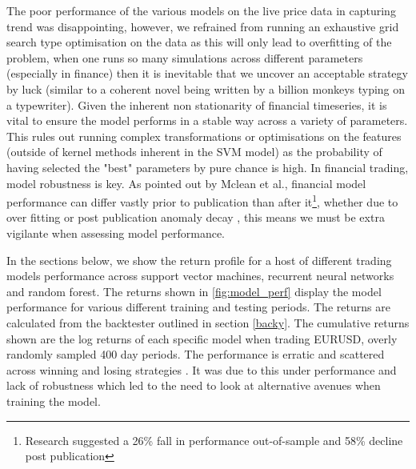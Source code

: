 \documentclass[11pt]{article}
\begin{document}
The poor performance of the various models on the live price data in capturing trend was disappointing, however, we refrained from running an exhaustive grid search type optimisation on the data as this will only lead to overfitting of the problem, when one runs so many simulations across different parameters (especially in finance) then it is inevitable that we uncover an acceptable strategy by luck (similar to a coherent novel being written by a billion monkeys typing on a typewriter). Given the inherent non stationarity of financial timeseries, it is vital to ensure the model performs in a stable way across a variety of parameters. This rules out running complex transformations or optimisations on the features (outside of kernel methods inherent in the SVM model) as the probability of having selected the "best" parameters by pure chance is high. In financial trading, model robustness is key. \newline As pointed out by Mclean et al.\cite{Mclean2016}, financial model performance can differ vastly prior to publication than after it\footnote{Research suggested a 26\% fall in performance out-of-sample and 58\% decline post publication}, whether due to over fitting or post publication anomaly decay \cite{Bartram2019}, this means we must be extra vigilante when assessing model performance.

In the sections below, we show the return profile for a host of different trading models performance across support vector machines, recurrent neural networks and random forest. The returns shown in  \ref{fig:model_perf} display the model performance for various different training and testing periods. The returns are calculated from the backtester outlined in section \ref{backy}. The cumulative returns shown are the log returns of each specific model when trading EURUSD, overly randomly sampled 400 day periods. The performance is erratic and scattered across winning and losing strategies . It was due to this under performance and lack of robustness which led to the need to look at alternative avenues when training the model.
\end{document}
